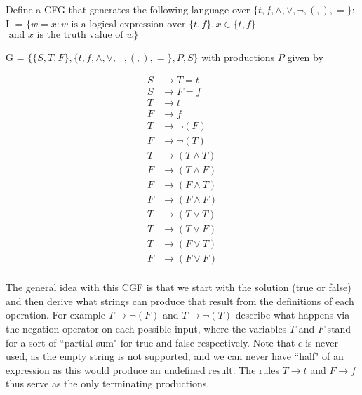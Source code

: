 \documentclass[12pt]{jhwhw}
\begin{document}
\problem{}

	Define a CFG that generates the following language over $\{t,f,\wedge,\vee,\neg,(,),=\}$: \\
	L = $\{w=x : w \text{ is a logical expression over } \{t,f\}, x\in \{t,f\}$
	$\text{ and } x \text{ is the truth value of } w\}$

\solution

	G = $\{\{S,T,F\}, \{t,f,\wedge,\vee,\neg,(,),=\}, P, S\}$ with productions $P$ given by

	\begin{align*}
		S &\rightarrow T=t \\
		S &\rightarrow F=f \\
		T &\rightarrow t \\
		F &\rightarrow f \\
		T &\rightarrow \neg(F) \\
		F &\rightarrow \neg(T) \\
		T &\rightarrow (T \wedge T) \\
		F &\rightarrow (T \wedge F) \\
		F &\rightarrow (F \wedge T) \\
		F &\rightarrow (F \wedge F) \\
		T &\rightarrow (T \vee T) \\
		T &\rightarrow (T \vee F) \\
		T &\rightarrow (F \vee T) \\
		F &\rightarrow (F \vee F) \\
	\end{align*}

	The general idea with this CGF is that we start with the solution (true or false) and
	then derive what strings can produce that result from the definitions of each operation.
	For example $T\rightarrow \neg(F)$ and $T\rightarrow \neg(T)$ describe what happens
	via the negation operator on each possible input, where the variables $T$ and $F$ stand
	for a sort of ``partial sum" for true and false respectively. Note that $\epsilon$ is 
	never used, as the empty string is not supported, and we can never have ``half" of an
	expression as this would produce an undefined result. The rules $T\rightarrow t$ and
	$F\rightarrow f$ thus serve as the only terminating productions.
\end{document}
